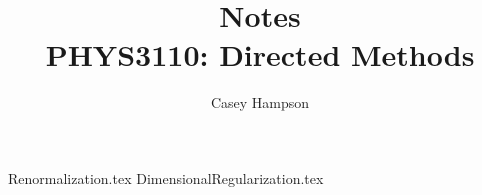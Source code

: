 \documentclass[titlepage]{article}
\title{Notes \\[5pt] PHYS3110: Directed Methods}
\author{Casey Hampson}
\begin{document}
    \maketitle
    \pagebreak

    {Renormalization.tex}
    {DimensionalRegularization.tex}
\end{document}
